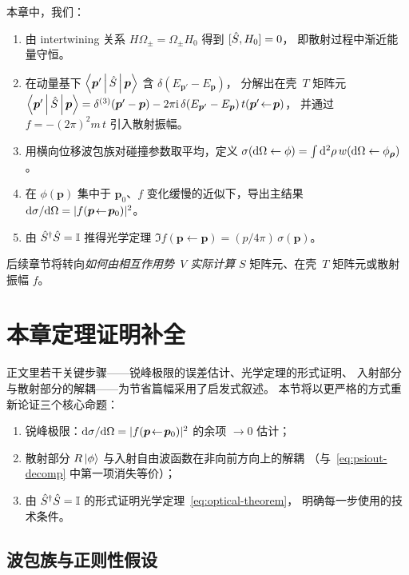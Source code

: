 本章中，我们：
\begin{enumerate}
\item 由 intertwining 关系 $H\Omega_\pm = \Omega_\pm H_0$ 得到 $[\hat{S},H_0]=0$，
即散射过程中渐近能量守恒。
\item 在动量基下 $\left\langle \bm{p}' \,\middle|\, \hat{S} \,\middle|\, \bm{p} \right\rangle$ 含 $\delta(E_{\bm{p}'}-E_{\bm{p}})$，
分解出在壳~$T$ 矩阵元
$\left\langle \bm{p}' \,\middle|\, \hat{S} \,\middle|\, \bm{p} \right\rangle = \delta^{(3)}(\bm{p}'-\bm{p}) - 2\pi\mathrm{i}\,\delta(E_{\bm{p}'}-E_{\bm{p}})\,t(\bm{p}'\!\leftarrow\!\bm{p})$，
并通过~$f = -(2\pi)^2 m\,t$ 引入散射振幅。
\item 用横向位移波包族对碰撞参数取平均，定义
$\sigma(\mathrm{d}\Omega\leftarrow\phi) = \int \mathrm{d}^2\rho\,w(\mathrm{d}\Omega\leftarrow\phi_{\bm{\rho}})$。
\item 在 $\phi(\bm{p})$ 集中于 $\bm{p}_0$、$f$ 变化缓慢的近似下，导出主结果
$\mathrm{d}\sigma/\mathrm{d}\Omega = |f(\bm{p}\!\leftarrow\!\bm{p}_0)|^2$。
\item 由 $\hat{S}^\dagger\hat{S} = \mathbb{I}$ 推得光学定理
$\Im f(\bm{p}\!\leftarrow\!\bm{p}) = (p/4\pi)\,\sigma(\bm{p})$。
\end{enumerate}
后续章节将转向\emph{如何由相互作用势~$V$ 实际计算} $S$ 矩阵元、在壳~$T$ 矩阵元或散射振幅 $f$。

\section{本章定理证明补全}\label{sec:cs-proofs}

正文里若干关键步骤——锐峰极限的误差估计、光学定理的形式证明、
入射部分与散射部分的解耦——为节省篇幅采用了启发式叙述。
本节将以更严格的方式重新论证三个核心命题：
\begin{enumerate}
\item 锐峰极限：$\mathrm{d}\sigma/\mathrm{d}\Omega = |f(\bm{p}\!\leftarrow\!\bm{p}_0)|^2$ 的余项 $\to 0$ 估计；
\item 散射部分 $R\ket{\phi}$ 与入射自由波函数在非向前方向上的解耦
（与~\eqref{eq:psiout-decomp} 中第一项消失等价）；
\item 由 $\hat{S}^\dagger\hat{S} = \mathbb{I}$ 的形式证明光学定理~\eqref{eq:optical-theorem}，
明确每一步使用的技术条件。
\end{enumerate}

\subsection{波包族与正则性假设}\label{ssec:cs-assumptions}

